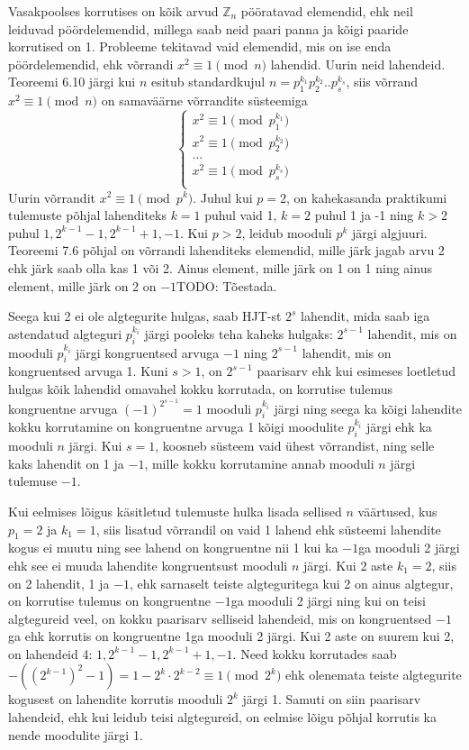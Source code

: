 \documentclass[a4paper, 10pt]{article}
\newcommand{\Z}{\mathbb{Z}}
\begin{document}
Vasakpoolses korrutises on kõik arvud $\Z_n$ pööratavad elemendid, ehk neil leiduvad pöördelemendid, millega saab neid paari panna ja kõigi paaride korrutised on 1. Probleeme tekitavad vaid elemendid, mis on ise enda pöördelemendid, ehk võrrandi $x^2\equiv1\pmod n$ lahendid. Uurin neid lahendeid. Teoreemi 6.10 järgi kui $n$ esitub standardkujul $n=p_1^{k_1}p_2^{k_2}..p_s^{k_s}$, siis võrrand $x^2\equiv1\pmod n$ on samaväärne võrrandite süsteemiga
$$\begin{cases}x^2\equiv1\pmod{p_1^{k_1}}\\x^2\equiv1\pmod{p_2^{k_2}}\\\dots\\x^2\equiv1\pmod{p_s^{k_s}}\\\end{cases}$$
Uurin võrrandit $x^2\equiv1\pmod {p^k}$. Juhul kui $p=2$, on kahekasanda praktikumi tulemuste põhjal lahenditeks $k=1$ puhul vaid 1, $k=2$ puhul 1 ja -1 ning $k>2$ puhul $1, 2^{k-1}-1, 2^{k-1}+1,-1$. Kui $p>2$, leidub mooduli $p^k$ järgi algjuuri. Teoreemi 7.6 põhjal on võrrandi lahenditeks elemendid, mille järk jagab arvu 2 ehk järk saab olla kas 1 või 2. Ainus element, mille järk on 1 on 1 ning ainus element, mille järk on 2 on $-1${\color{red}TODO: Tõestada}.

Seega kui 2 ei ole algtegurite hulgas, saab HJT-st $2^s$ lahendit, mida saab iga astendatud algteguri $p_i^{k_i}$ järgi pooleks teha kaheks hulgaks: $2^{s-1}$ lahendit, mis on mooduli $p_i^{k_i}$ järgi kongruentsed arvuga $-1$ ning $2^{s-1}$ lahendit, mis on kongruentsed arvuga 1. Kuni $s>1$, on $2^{s-1}$ paarisarv ehk kui esimeses loetletud hulgas kõik lahendid omavahel kokku korrutada, on korrutise tulemus kongruentne arvuga $(-1)^{2^{s-1}}=1$ mooduli $p_i^{k_i}$ järgi ning seega ka kõigi lahendite kokku korrutamine on kongruentne arvuga 1 kõigi moodulite $p_i^{k_i}$ järgi ehk ka mooduli $n$ järgi. Kui $s=1$, koosneb süsteem vaid ühest võrrandist, ning selle kaks lahendit on 1 ja $-1$, mille kokku korrutamine annab mooduli $n$ järgi tulemuse $-1$.

Kui eelmises lõigus käsitletud tulemuste hulka lisada sellised $n$ väärtused, kus $p_1=2$ ja $k_1=1$, siis lisatud võrrandil on vaid 1 lahend ehk süsteemi lahendite kogus ei muutu ning see lahend on kongruentne nii 1 kui ka $-1$ga mooduli 2 järgi ehk see ei muuda lahendite kongruentsust mooduli $n$ järgi. Kui 2 aste $k_1=2$, siis on 2 lahendit, 1 ja $-1$, ehk sarnaselt teiste algteguritega kui 2 on ainus algtegur, on korrutise tulemus on kongruentne $-1$ga mooduli 2 järgi ning kui on teisi algtegureid veel, on kokku paarisarv selliseid lahendeid, mis on kongruentsed $-1$ga ehk korrutis on kongruentne 1ga mooduli 2 järgi. Kui 2 aste on suurem kui 2, on lahendeid 4: $1, 2^{k-1}-1, 2^{k-1}+1,-1$. Need kokku korrutades saab $-((2^{k-1})^2-1)=1-2^k\cdot2^{k-2}\equiv1\pmod{2^k}$ ehk olenemata teiste algtegurite kogusest on lahendite korrutis mooduli $2^k$ järgi 1. Samuti on siin paarisarv lahendeid, ehk kui leidub teisi algtegureid, on eelmise lõigu põhjal korrutis ka nende moodulite järgi 1.
\end{document}
